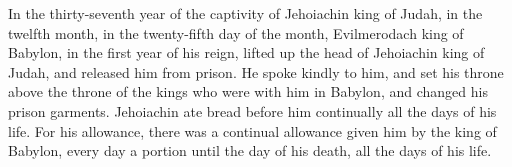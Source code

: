\begin{paracol}{2}
\begin{otherlanguage}{english}
 In the thirty-seventh year of the captivity of
Jehoiachin king of Judah, in the twelfth month, in the twenty-fifth day
of the month, Evilmerodach king of Babylon, in the first year of his
reign, lifted up the head of Jehoiachin king of Judah, and released him
from prison.  He spoke kindly to him, and set his throne
above the throne of the kings who were with him in Babylon,
 and changed his prison garments. Jehoiachin ate bread
before him continually all the days of his life.  For his
allowance, there was a continual allowance given him by the king of
Babylon, every day a portion until the day of his death, all the days of
his life. \end{otherlanguage} \end{paracol}
